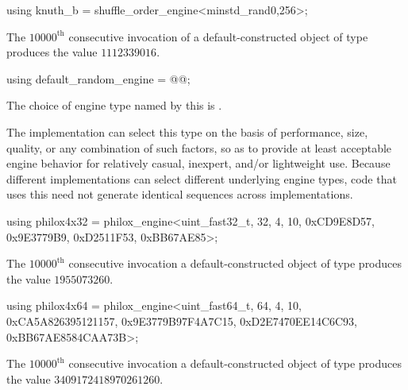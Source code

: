 %
\begin{itemdecl}
using knuth_b = shuffle_order_engine<minstd_rand0,256>;
\end{itemdecl}

\begin{itemdescr}
\pnum
\required
 The $10000^\text{th}$ consecutive invocation
 of a default-constructed object
 of type 
 produces the value $1112339016$.
\end{itemdescr}%

%
\begin{itemdecl}
using default_random_engine = @\textit{}@;
\end{itemdecl}

\begin{itemdescr}
\pnum
\remarks
The choice of engine type
named by this 
is .
\begin{note}
 The implementation
 can select this type
 on the basis of performance,
 size,
 quality,
 or any combination of such factors,
 so as to provide at least acceptable engine behavior
 for relatively casual, inexpert, and/or lightweight use.
 Because different implementations
 can select different underlying engine types,
 code that uses this 
 need not generate identical sequences across implementations.
\end{note}
\end{itemdescr}%

%
\begin{itemdecl}
using philox4x32 =
      philox_engine<uint_fast32_t, 32, 4, 10,
       0xCD9E8D57, 0x9E3779B9, 0xD2511F53, 0xBB67AE85>;
\end{itemdecl}

\begin{itemdescr}
\pnum
\required
The $10000^\text{th}$ consecutive invocation
a default-constructed object of type 
produces the value $1955073260$.
\end{itemdescr}%

%
\begin{itemdecl}
using philox4x64 =
      philox_engine<uint_fast64_t, 64, 4, 10,
       0xCA5A826395121157, 0x9E3779B97F4A7C15, 0xD2E7470EE14C6C93, 0xBB67AE8584CAA73B>;
\end{itemdecl}

\begin{itemdescr}
\pnum
\required
The $10000^\text{th}$ consecutive invocation
a default-constructed object of type 
produces the value $3409172418970261260$.
\end{itemdescr}%
%
%


